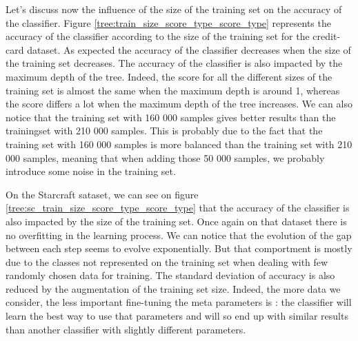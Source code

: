 \documentclass[10pt]{article}
\begin{document}
		Let's discuss now the influence of the size of the training set on the accuracy of the classifier. Figure \ref{tree:train_size_score_type_score_type} represents the accuracy of the classifier according to the size of the training set for the credit-card dataset. As expected the accuracy of the classifier decreases when the size of the training set decreases. The accuracy of the classifier is also impacted by the maximum depth of the tree. Indeed, the score for all the different sizes of the training set is almost the same when the maximum depth is around 1, whereas the score differs a lot when the maximum depth of the tree increases. We can also notice that the training set with 160 000 samples gives better results than the trainingset with 210 000 samples. This is probably due to the fact that the training set with 160 000 samples is more balanced than the training set with 210 000 samples, meaning that when adding those 50 000 samples, we probably introduce some noise in the training set.

		On the Starcraft sataset, we can see on figure \ref{tree:sc_train_size_score_type_score_type} that the accuracy of the classifier is also impacted by the size of the training set. Once again on that dataset there is no overfitting in the learning process. We can notice that the evolution of the gap between each step seems to evolve exponentially. But that comportment is mostly due to the classes not represented on the training set when dealing with few randomly chosen data for training. The standard deviation of accuracy is also reduced by the augmentation of the training set size. Indeed, the more data we consider, the less important fine-tuning the meta parameters is : the classifier will learn the best way to use that parameters and will so end up with similar results than another classifier with slightly different parameters.
\end{document}
